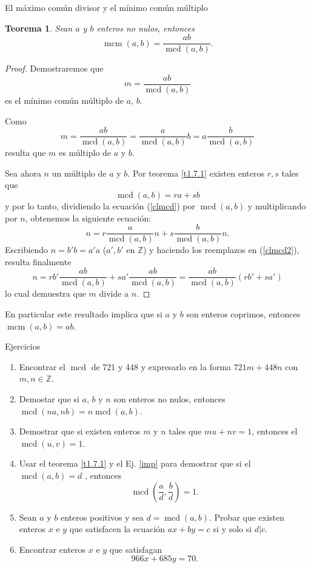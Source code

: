 \documentclass[11pt,spanish,makeidx]{amsbook}
\newtheorem{teorema}{Teorema}[section]
\theoremstyle{definition}
\theoremstyle{remark}
\newcommand \mcd{\operatorname{mcd}}
\newcommand \mcm{\operatorname{mcm}}
\begin{document}
\begin{section}{El máximo común divisor y el mínimo común múltiplo}
\begin{teorema}\label{t1.7.2} Sean $a$ y $b$ enteros no nulos, entonces
$$
\mcm(a,b)=\frac{a b}{\mcd(a,b)}.
$$
\end{teorema}
\begin{proof} Demostraremos que
$$
m=\frac{a b}{\mcd(a,b)}
$$
es el mínimo común múltiplo de $a$, $b$.

Como
$$
m=\frac{a b}{\mcd(a,b)}=\frac{a}{\mcd(a,b)} b
=a\frac{b}{\mcd(a,b)}
$$
resulta que $m$ es múltiplo de $a$ y $b$.

Sea ahora $n$ un múltiplo de $a$ y $b$. Por teorema \ref{t1.7.1} existen enteros $r,s$ tales que 
\begin{equation}\label{clmcd}
\mcd(a,b)=ra+sb
\end{equation} 
y por lo tanto,
dividiendo la ecuación (\ref{clmcd}) por $\mcd(a,b)$ y multiplicando por $n$, obtenemos la siguiente ecuación:
\begin{equation}\label{clmcd2}
n= r\frac{a}{\mcd(a,b)}n + s\frac{b}{\mcd(a,b)}n.
\end{equation} 
Escribiendo $n=b'b=a'a$ ($a',b'$ en $\mathbb Z$) y haciendo los reemplazos en (\ref{clmcd2}), resulta finalmente
\begin{equation}\label{clmcd3}
n= rb'\frac{a b}{\mcd(a,b)}+sa'\frac{a b}{\mcd(a,b)}= \frac{a b}{\mcd(a,b)}(rb'+sa')
\end{equation}
lo cual demuestra que $m$ divide a $n$.
\end{proof}

En particular este resultado implica que si $a$ y $b$ son enteros coprimos, entonces $\mcm(a,b)=ab$.

\begin{subsection}{Ejercicios}
\begin{enumerate}
\item Encontrar el $\mcd$ de 721 y 448 y expresarlo en la forma
$721m+448n$ con $m,n \in \mathbb Z$.
\item Demostar que si $a$, $b$ y $n$ son enteros no nulos, entonces
$\mcd(na,nb)=n\mcd(a,b)$.
\item\label{imp} Demostrar que si existen enteros $m$ y $n$ tales que $mu+nv=1$, entonces el
$\mcd(u,v)=1$.
\item Usar el teorema \ref{t1.7.1} y el Ej. \ref{imp} para demostrar que si el
$\mcd(a,b)=d$ , entonces
$$
\mcd\left(\frac{a}{d},\frac{b}{d}\right) =1.
$$
\item  Sean $a$ y $b$ enteros positivos y sea $d=\mcd(a,b)$. Probar que existen enteros $ x$ e $y$ que satisfacen la ecuación $ax+by=c$ si y solo si $d|c$.
\item  Encontrar enteros $x$ e $y$ que satisfagan
$$
966x+685y=70.
$$
\end{enumerate}
\end{subsection}

\end{section}
\end{document}
